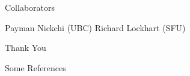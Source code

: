 \documentclass[14pt]{beamer}
\begin{document}
\begin{frame}{Collaborators}
    \begin{outline}
        \1 Payman Nickchi (UBC)
        \1 Richard Lockhart (SFU)
    \end{outline}

\end{frame}



\begin{frame}
    \centering
    \Huge Thank You
\end{frame}

\begin{frame}{Some References}
    
    
\end{frame}
\end{document}
